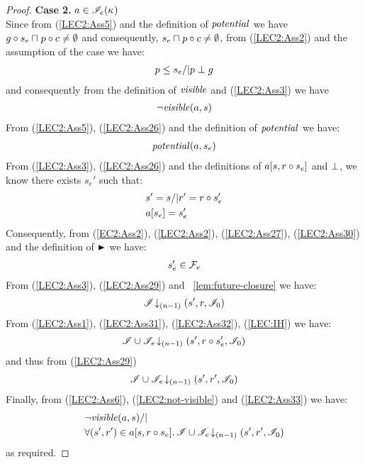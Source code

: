 \begin{lemma}
\begin{proof}
\noindent\textbf{Case 2. } $a \in \mathscr{I}_e(\kappa_{})$\\
Since from (\ref{LEC2:Ass5}) and the definition of $\mathit{potential}$ we have $g \circ s_e \sqcap_{} p \circ c \not= \emptyset$ and consequently, $s_e \sqcap_{} p \circ c \not= \emptyset$, from (\ref{LEC2:Ass2}) and the assumption of the case we have:
%
\begin{align}
	p \leq s_e /| p \mathrel{\bot} g \label{LEC2:Ass26}
\end{align}
% 
and consequently from the definition of $\mathit{visible}$ and (\ref{LEC2:Ass3}) we have
%
\begin{align}
	\neg\mathit{visible}(a, s)
	\label{LEC2:not-visible}
\end{align}
%
From (\ref{LEC2:Ass5}), (\ref{LEC2:Ass26}) and the definition of $\mathit{potential}$ we have:
%
\begin{align}
	\mathit{potential}(a, s_e) \label{LEC2:Ass27}
\end{align}
%
From (\ref{LEC2:Ass3}), (\ref{LEC2:Ass26}) and the definitions of $a[s, r \circ s_e]$ and $\mathrel{\bot}$, we know there exists $s_e'$ such that: 
%
\begin{align}
	& s' = s /| r' = r \circ s_e' \label{LEC2:Ass29}\\
	& a[s_e] = s_e'  \label{LEC2:Ass30}
\end{align}
%
Consequently, from (\ref{EC2:Ass2}), (\ref{LEC2:Ass2}), (\ref{LEC2:Ass27}), (\ref{LEC2:Ass30}) and the definition of $\strictfences$ we have:
%
\begin{align}
	s_e' \in \mathcal{F}_{e}  \label{LEC2:Ass31}
\end{align}
%
From (\ref{LEC2:Ass3}), (\ref{LEC2:Ass29}) and \lem~\ref{lem:future-closure} we have:
%
\begin{align}
	\mathscr{I} \!\downarrow_{(n-1)} \left(s', r, \mathscr{I}_0\right)  \label{LEC2:Ass32}
\end{align}
%
From (\ref{LEC2:Ass1}), (\ref{LEC2:Ass31}), (\ref{LEC2:Ass32}), (\ref{LEC:IH}) we have:
%
\begin{align*}
	\mathscr{I} \cup \mathscr{I}_{e} \!\downarrow_{(n-1)} \left(s', r \circ s_e', \mathscr{I}_0\right)
\end{align*}
%
and thus from (\ref{LEC2:Ass29}) 
%
\begin{align}
	\mathscr{I} \cup \mathscr{I}_{e} \!\downarrow_{(n-1)} \left(s', r', \mathscr{I}_0\right)
	\label{LEC2:Ass33}
\end{align}
%
Finally, from (\ref{LEC2:Ass6}), (\ref{LEC2:not-visible}) and (\ref{LEC2:Ass33}) we have:
%
\begin{align*}
	&\neg\mathit{visible}(a, s) /|\\
	& \forall (s', r') \in a[s, r \circ s_e].\, \mathscr{I} \cup \mathscr{I}_{e} \!\downarrow_{(n-1)} \left(s', r', \mathscr{I}_0\right)
\end{align*}
%
as required.

\end{proof}
\end{lemma}


